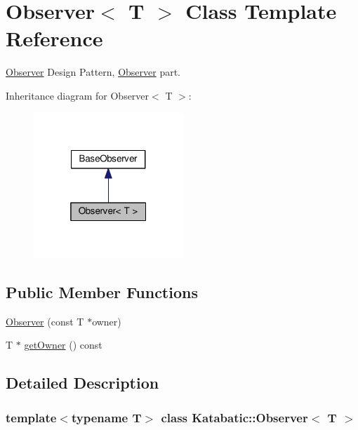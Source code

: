 \hypertarget{classKatabatic_1_1Observer}{}\section{Observer$<$ T $>$ Class Template Reference}
\label{classKatabatic_1_1Observer}


\mbox{\hyperlink{classKatabatic_1_1Observer}{Observer}} Design Pattern, \mbox{\hyperlink{classKatabatic_1_1Observer}{Observer}} part.  




Inheritance diagram for Observer$<$ T $>$\+:\nopagebreak
\begin{figure}[H]
\begin{center}
\leavevmode
\includegraphics[width=160pt]{classKatabatic_1_1Observer__inherit__graph}
\end{center}
\end{figure}
\subsection*{Public Member Functions}
\begin{DoxyCompactItemize}
\item 
\mbox{\hyperlink{classKatabatic_1_1Observer_ab05ec12517c51952960dd4f324499b44}{Observer}} (const T $\ast$owner)
\item 
T $\ast$ \mbox{\hyperlink{classKatabatic_1_1Observer_ac29b8f99d632058c95784fd7233b8474}{get\+Owner}} () const
\end{DoxyCompactItemize}


\subsection{Detailed Description}
\subsubsection*{template$<$typename T$>$\newline
class Katabatic\+::\+Observer$<$ T $>$}

